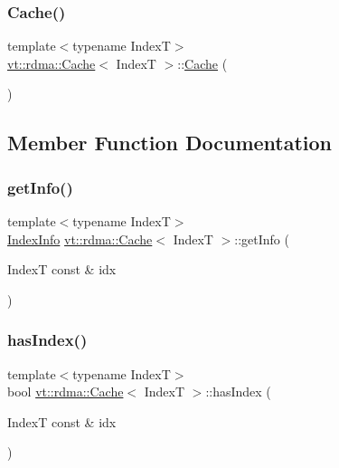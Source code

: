 \subsubsection{\texorpdfstring{Cache()}{Cache()}}
{\footnotesize\ttfamily template$<$typename IndexT$>$ \\
\hyperlink{structvt_1_1rdma_1_1_cache}{vt\+::rdma\+::\+Cache}$<$ IndexT $>$\+::\hyperlink{structvt_1_1rdma_1_1_cache}{Cache} (\begin{DoxyParamCaption}{ }\end{DoxyParamCaption})\hspace{0.3cm}{\ttfamily [default]}}



\subsection{Member Function Documentation}
\mbox{\label{structvt_1_1rdma_1_1_cache_a104e7024e31f8c145e12c0e98e6593d0}} 
\subsubsection{\texorpdfstring{get\+Info()}{getInfo()}}
{\footnotesize\ttfamily template$<$typename IndexT$>$ \\
\hyperlink{structvt_1_1rdma_1_1_index_info}{Index\+Info} \hyperlink{structvt_1_1rdma_1_1_cache}{vt\+::rdma\+::\+Cache}$<$ IndexT $>$\+::get\+Info (\begin{DoxyParamCaption}\item[{IndexT const \&}]{idx }\end{DoxyParamCaption})\hspace{0.3cm}{\ttfamily [inline]}}

\mbox{\label{structvt_1_1rdma_1_1_cache_ab67a0c4c650e06a0581a6ddd41a5313b}} 
\subsubsection{\texorpdfstring{has\+Index()}{hasIndex()}}
{\footnotesize\ttfamily template$<$typename IndexT$>$ \\
bool \hyperlink{structvt_1_1rdma_1_1_cache}{vt\+::rdma\+::\+Cache}$<$ IndexT $>$\+::has\+Index (\begin{DoxyParamCaption}\item[{IndexT const \&}]{idx }\end{DoxyParamCaption})\hspace{0.3cm}{\ttfamily [inline]}}

